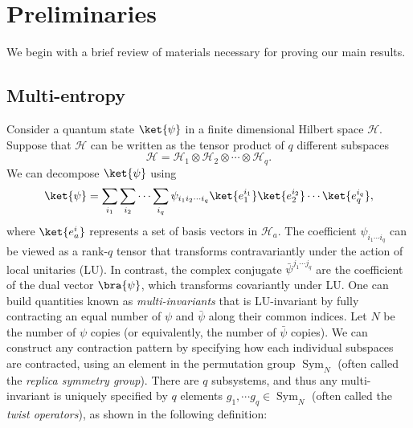 \documentclass[11pt,oneside,letterpaper]{article}
\numberwithin{equation}{section}
\theoremstyle{definition}
\theoremstyle{remark}
\DeclareMathOperator{\Sym}{Sym}
\begin{document}
\section{Preliminaries}
\label{sec:prelim}
We begin with a brief review of materials necessary for proving our main results.

\subsection{Multi-entropy}
Consider a quantum state $\ket{\psi}$ in a finite dimensional Hilbert space $\mathcal{H}$. Suppose that $\mathcal{H}$ can be written as the tensor product of $q$ different subspaces
\begin{equation}
  \mathcal{H} = \mathcal{H}_1 \otimes \mathcal{H}_2 \otimes \cdots \otimes \mathcal{H}_q.
\end{equation}
We can decompose $\ket{\psi}$ using
\begin{equation}
  \label{eq:psi_decomp}
  \ket{\psi} = \sum_{i_1}\sum_{i_2}\cdots \sum_{i_q} \psi_{i_1i_2\cdots i_q}\ket{e^{i_1}_1} \ket{e^{i_2}_2} \cdots \ket{e^{i_q}_q},
\end{equation}
where $\ket{e^{i}_a}$ represents a set of basis vectors in $\mathcal{H}_a$.
The coefficient $\psi_{i_1 \cdots i_q}$ can be viewed as a rank-$q$ tensor that transforms contravariantly under the action of local unitaries (LU). In contrast, the complex conjugate $\bar{\psi}^{j_1\cdots j_q}$ are the coefficient of the dual vector $\bra{\psi}$, which transforms covariantly under LU. One can build quantities known as \emph{multi-invariants} \cite{Gadde:2024taa} that is LU-invariant by fully contracting an equal number of $\psi$ and $\bar{\psi}$ along their common indices.
Let $N$ be the number of $\psi$ copies (or equivalently, the number of $\bar{\psi}$ copies). We can construct any contraction pattern by specifying how each individual subspaces are contracted, using an element in the permutation group $\Sym_N$ (often called the \emph{replica symmetry group}). There are $q$ subsystems, and thus any multi-invariant is uniquely specified by $q$ elements $g_1,\cdots g_q\in \Sym_N$ (often called the \emph{twist operators}), as shown in the following definition:
\end{document}
